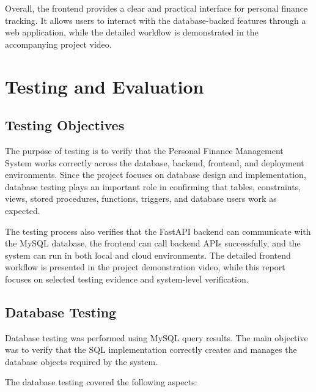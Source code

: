 \documentclass{article}
\begin{document}
Overall, the frontend provides a clear and practical interface for personal finance tracking. It allows users to interact with the database-backed features through a web application, while the detailed workflow is demonstrated in the accompanying project video.

\section{Testing and Evaluation}
\label{sec:testing-evaluation}

\subsection{Testing Objectives}

The purpose of testing is to verify that the Personal Finance Management System works correctly across the database, backend, frontend, and deployment environments. Since the project focuses on database design and implementation, database testing plays an important role in confirming that tables, constraints, views, stored procedures, functions, triggers, and database users work as expected.

The testing process also verifies that the FastAPI backend can communicate with the MySQL database, the frontend can call backend APIs successfully, and the system can run in both local and cloud environments. The detailed frontend workflow is presented in the project demonstration video, while this report focuses on selected testing evidence and system-level verification.

\subsection{Database Testing}

Database testing was performed using MySQL query results. The main objective was to verify that the SQL implementation correctly creates and manages the database objects required by the system.

The database testing covered the following aspects:
\end{document}
